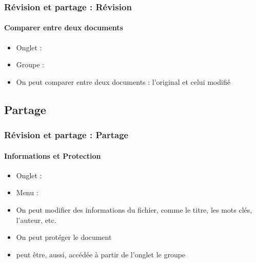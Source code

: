 \documentclass[xcolor=table]{beamer}
\begin{document}
\begin{frame}
\frametitle{Révision et partage : Révision}
\framesubtitle{Comparer entre deux documents}

\begin{minipage}{0.41\textwidth}
	\begin{itemize}
		\item Onglet : 
		\item Groupe : 
		\item On peut comparer entre deux documents : l'original et celui modifié 
	\end{itemize}
\end{minipage}
\begin{minipage}{0.58\textwidth}
	
	
\end{minipage}

\end{frame}

\subsection{Partage}

%
%

\begin{frame}
\frametitle{Révision et partage : Partage}
\framesubtitle{Informations et Protection}

\begin{minipage}{0.41\textwidth}
	\begin{itemize}
		\item Onglet : 
		\item Menu : 
		\item On peut modifier des informations du fichier, comme le titre, les mots clés, l'auteur, etc. 
		\item On peut protéger le document
		\item {} peut être, aussi, accédée à partir de l'onglet  le groupe 
	\end{itemize}
\end{minipage}
\begin{minipage}{0.58\textwidth}
\end{minipage}

\end{frame}
\end{document}
